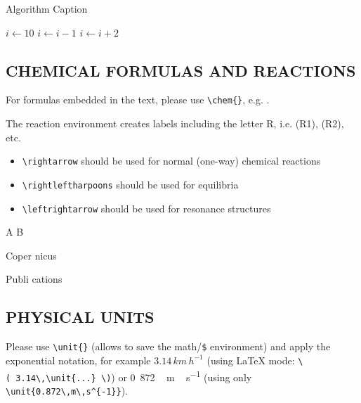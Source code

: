 \documentclass[gc, manuscript]{copernicus}
\begin{document}
\begin{algorithm}
\caption{Algorithm Caption}
\label{a1}
\begin{algorithmic}
\STATE $i\gets 10$
        \STATE $i\gets i-1$
\ELSE
                \STATE $i\gets i+2$
        \ENDIF
\ENDIF
\end{algorithmic}
\end{algorithm}

\subsection{CHEMICAL FORMULAS AND REACTIONS}

For formulas embedded in the text, please use
\texttt{\textbackslash{}chem\{\}}, e.g. .

The reaction environment creates labels including the letter R, i.e.
(R1), (R2), etc.

\begin{itemize}
\item
  \texttt{\textbackslash{}rightarrow} should be used for normal
  (one-way) chemical reactions
\item
  \texttt{\textbackslash{}rightleftharpoons} should be used for
  equilibria
\item
  \texttt{\textbackslash{}leftrightarrow} should be used for resonance
  structures
\end{itemize}

\begin{reaction}
A \rightarrow B \\
\end{reaction}
\begin{reaction}
Coper \rightleftharpoons nicus \\
\end{reaction}
\begin{reaction}
Publi \leftrightarrow cations
\end{reaction}

\subsection{PHYSICAL UNITS}

Please use \texttt{\textbackslash{}unit\{\}} (allows to save the
math/\texttt{\$} environment) and apply the exponential notation, for
example \(3.14\,\unit{km\,h^{-1}}\) (using LaTeX mode:
\texttt{\textbackslash{}(\ 3.14\textbackslash{},\textbackslash{}unit\{...\}\ \textbackslash{})})
or \unit{0.872\,m\,s^{-1}} (using only
\texttt{\textbackslash{}unit\{0.872\textbackslash{},m\textbackslash{},s\^{}\{-1\}\}}).
\end{document}
